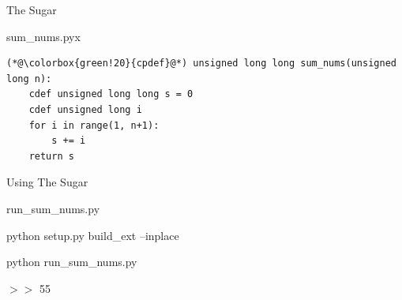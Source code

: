 \documentclass[11pt]{beamer}
\begin{document}
\begin{frame}[fragile]{The Sugar}
	\raggedright
	sum\_nums.pyx
	\begin{lstlisting}
(*@\colorbox{green!20}{cpdef}@*) unsigned long long sum_nums(unsigned long n):
    cdef unsigned long long s = 0
    cdef unsigned long i
    for i in range(1, n+1):
        s += i
    return s
	\end{lstlisting}
\end{frame}

\begin{frame}[fragile]{Using The Sugar}
	\raggedright
	run\_sum\_nums.py
	
	
	\pause
	python setup.py build\_ext --inplace
	
	python run\_sum\_nums.py
	
	\pause
	$>>$ 55
	
\end{frame}
\end{document}
